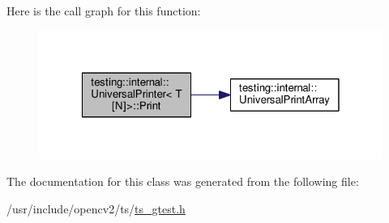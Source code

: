 Here is the call graph for this function\-:\nopagebreak
\begin{figure}[H]
\begin{center}
\leavevmode
\includegraphics[width=320pt]{classtesting_1_1internal_1_1UniversalPrinter_3_01T[N]_4_a47e8cb5abce40735db381910513a4721_cgraph}
\end{center}
\end{figure}




The documentation for this class was generated from the following file\-:\begin{DoxyCompactItemize}
\item 
/usr/include/opencv2/ts/\hyperlink{ts__gtest_8h}{ts\-\_\-gtest.\-h}\end{DoxyCompactItemize}

